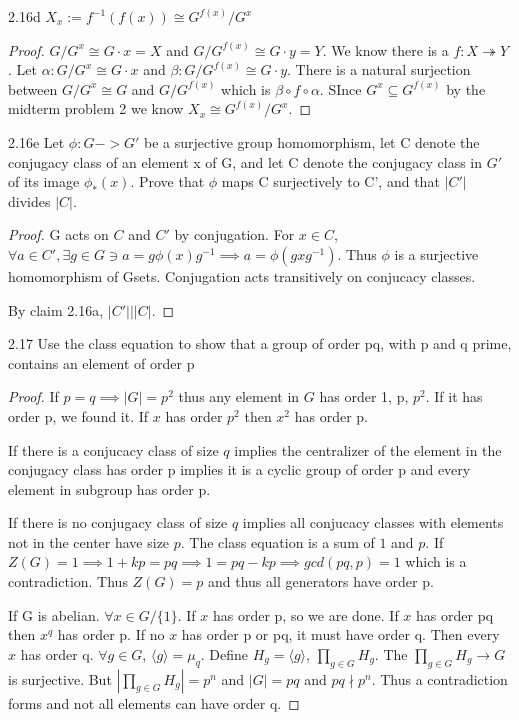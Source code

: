 \documentclass{article}
\newcommand{\abs}[1]{\lvert #1\rvert}
\begin{document}
\begin{claim}{2.16d}
    $X_x := f^{-1}(f(x)) \cong G^{f(x)}/G^x$
\end{claim}
\begin{proof}
    $G/G^x \cong G \cdot x = X$ and $G/G^{f(x)} \cong G \cdot y = Y$. We know there is a $f: X \twoheadrightarrow Y$. Let $\alpha: G/G^x \cong G \cdot x$ and $\beta: G/G^{f(x)} \cong G \cdot y$. There is a natural surjection between $G/G^x \cong G $ and $G/G^{f(x)}$ which is $\beta \circ f \circ \alpha$. SInce $G^x \subseteq G^{f(x)}$ by the midterm problem 2 we know $X_x \cong G^{f(x)}/G^x$.
\end{proof}

\begin{PROB}{2.16e}\label{Problem 2.16e.}
    Let $\phi : G -> G'$ be a surjective group homomorphism, let C denote the conjugacy class of an element x of G, and let C denote the conjugacy class in $G'$ of its image $\phi_*(x)$. Prove that $\phi$ maps C surjectively to C', and that $|C'|$ divides $|C|$.
\end{PROB}
\begin{proof}
    G acts on $C$ and $C'$ by conjugation. For $x \in C$, $\forall a \in C', \exists g \in G \ni a = g \phi(x) g^{-1} \implies a = \phi(gxg^{-1})$. Thus $\phi$ is a surjective homomorphism of Gsets. Conjugation acts transitively on conjucacy classes. 
    
    By claim 2.16a, $\abs{C'} | |C|$.
\end{proof}

\bigskip

\begin{PROB}{2.17}\label{Problem 2.17.}
    Use the class equation to show that a group of order pq, with p and q prime, contains an element of order p
\end{PROB}
\begin{proof}
    If $p = q \implies |G| = p^2$ thus any element in $G$ has order 1, p, $p^2$. If it has order p, we found it. If $x$ has order $p^2$ then $x^2$ has order p.

    If there is a conjucacy class of size $q$ implies the centralizer of the element in the conjugacy class has order p implies it is a cyclic group of order p and every element in subgroup has order p. 

    If there is no conjugacy class of size $q$ implies all conjucacy classes with elements not in the center have size $p$. The class equation is a sum of $1$ and $p$. If $Z(G) = 1 \implies 1 + kp = pq \implies 1 = pq - kp \implies gcd(pq, p) = 1$ which is a contradiction. Thus $Z(G) = p$ and thus all generators have order p.

    If G is abelian. $\forall x \in G/\{1\}$. If $x$ has order p, so we are done. If $x$ has order pq then $x^q$ has order p. If no $x$ has order p or pq, it must have order q. Then every $x$ has order q. $\forall g \in G$, $\langle g \rangle = \mu_q$. Define $H_g = \langle g \rangle$,  $\prod_{g \in G} H_g$. The $\prod_{g \in G} H_g \to G$ is surjective. But $|\prod_{g \in G} H_g| = p^n$ and $|G| = pq$ and $pq \nmid p^n$. Thus a contradiction forms and not all elements can have order q.
\end{proof}
\end{document}
